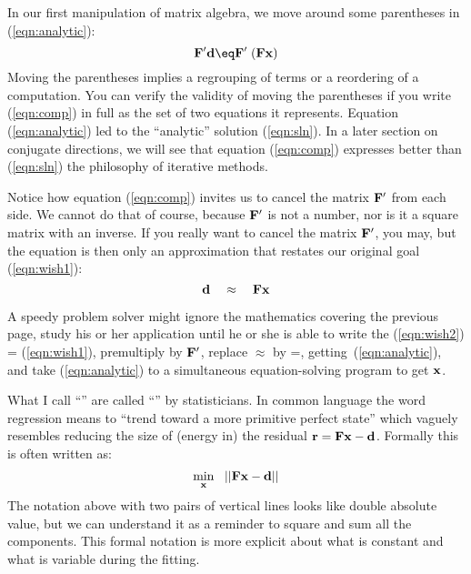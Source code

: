\par
{}

\par
In our first manipulation of matrix algebra,
we move around some parentheses in 
(\ref{eqn:analytic}):
\begin{equation}
\bold F' \dd \eq  \bold F' \; (\bold F   \bold x )
\label{eqn:comp}
\end{equation}
Moving the parentheses implies a regrouping of terms
or a reordering of a computation.
You can verify the validity of moving the parentheses
if you write (\ref{eqn:comp}) in full as the set of two equations it represents.
Equation
(\ref{eqn:analytic})
led to the ``analytic'' solution (\ref{eqn:sln}).
In a later section on conjugate directions,
we will see that equation
(\ref{eqn:comp})
expresses better than
(\ref{eqn:sln})
the philosophy of iterative methods.

\par
Notice how equation
(\ref{eqn:comp})
invites us to cancel the matrix
$\bold F'$
from each side.
We cannot do that of course, because
$\bold F'$
is not a number, nor is it a square matrix with an inverse.
If you really want to cancel the matrix $\bold F'$, you may,
but the equation is then only an approximation
that restates our original goal (\ref{eqn:wish1}):
\begin{equation}
{\bf d}  \quad \approx \quad \bold F   \bold x 
\label{eqn:wish2}
\end{equation}

\par
A speedy problem solver might
ignore the mathematics covering the previous page,
study his or her application until he or she
is able to write the 
(\ref{eqn:wish2}) = (\ref{eqn:wish1}),
premultiply by $\bold F'$,
replace $\approx$ by =,
getting~(\ref{eqn:analytic}),
and take
(\ref{eqn:analytic})
to a simultaneous equation-solving program to get $\bold x$.

\par
What I call ``'' are called
``'' by statisticians.
In common language the word regression means
to ``trend toward a more primitive perfect state''
which vaguely resembles reducing the size of (energy in)
the residual $\bold r = \bold F \bold x - \bold d $.
Formally this is often written as:
\begin{equation}
\min_{\bold x} \ \  || \bold F \bold x - \bold d || 
\label{eqn:norm}
\end{equation}
The notation above with two pairs of vertical lines
looks like double absolute value,
but we can understand it as a reminder to square and sum all the components.
This formal notation is more explicit
about what is constant and what is variable during the fitting.

